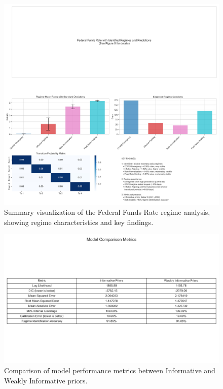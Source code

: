 \begin{figure}[htbp]
    \centering
    \includegraphics[width=\textwidth]{figure7_final_summary_visualization.jpg}
    \caption{Summary visualization of the Federal Funds Rate regime analysis, showing regime characteristics and key findings.}
    \label{fig:summary}
\end{figure}

\begin{figure}[htbp]
    \centering
    \includegraphics[width=\textwidth]{figure8_model_comparison_table.jpg}
    \caption{Comparison of model performance metrics between Informative and Weakly Informative priors.}
    \label{fig:comparison_table}
\end{figure}

